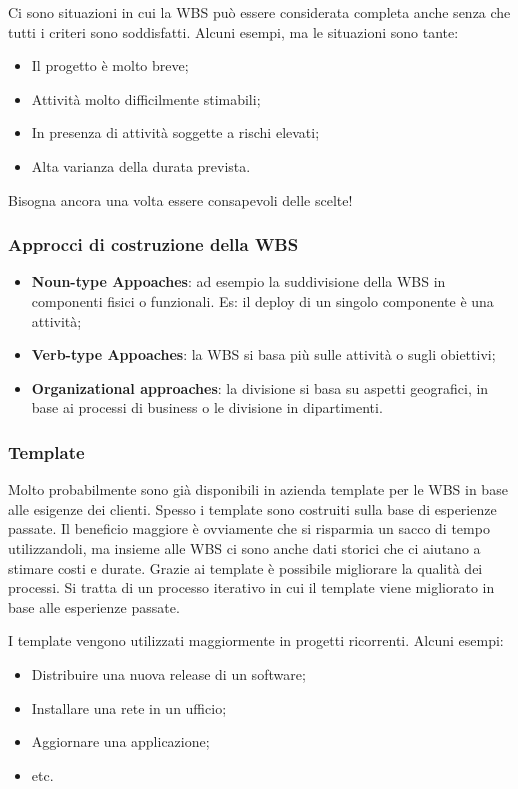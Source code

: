 \begin{warn}
	Ci sono situazioni in cui la WBS può essere considerata completa anche senza che tutti i criteri sono soddisfatti. Alcuni esempi, ma le situazioni sono tante:
	\begin{itemize}
		\item Il progetto è molto breve;
		\item Attività molto difficilmente stimabili;
		\item In presenza di attività soggette a rischi elevati;
		\item Alta varianza della durata prevista.
	\end{itemize}
	Bisogna ancora una volta essere consapevoli delle scelte!
\end{warn}
\subsubsection{Approcci di costruzione della WBS}
\begin{itemize}
	\item \textbf{Noun-type Appoaches}: ad esempio la suddivisione della WBS in componenti fisici o funzionali. Es: il deploy di un singolo componente è una attività;
	\item \textbf{Verb-type Appoaches}: la WBS si basa più sulle attività o sugli obiettivi;
	\item \textbf{Organizational approaches}: la divisione si basa su aspetti geografici, in base ai processi di business o le divisione in dipartimenti.
\end{itemize}
\subsubsection{Template}
Molto probabilmente sono già disponibili in azienda template per le WBS in base alle esigenze dei clienti. Spesso i template sono costruiti sulla base di esperienze passate. Il beneficio maggiore è ovviamente che si risparmia un sacco di tempo utilizzandoli, ma insieme alle WBS ci sono anche dati storici che ci aiutano a stimare costi e durate. Grazie ai template è possibile migliorare la qualità dei processi. Si tratta di un processo iterativo in cui il template viene migliorato in base alle esperienze passate.

\noindent I template vengono utilizzati maggiormente in progetti ricorrenti. Alcuni esempi:
\begin{itemize}
	\item Distribuire una nuova release di un software;
	\item Installare una rete in un ufficio;
	\item Aggiornare una applicazione;
	\item etc.
\end{itemize}
